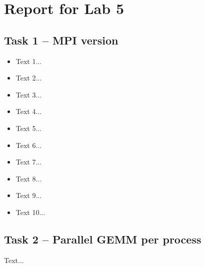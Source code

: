 \documentclass[a4paper, DIV12, headsepline]{scrartcl}
\begin{document}
\section*{Report for Lab 5}
\subsection*{Task 1 -- MPI version}
\begin{itemize}
\item Text 1...
\item Text 2...
\item Text 3...
\item Text 4...
\item Text 5...
\item Text 6...
\item Text 7...
\item Text 8...
\item Text 9...
\item Text 10...
\end{itemize}

\subsection*{Task 2 -- Parallel GEMM per process}
Text...
\end{document}
